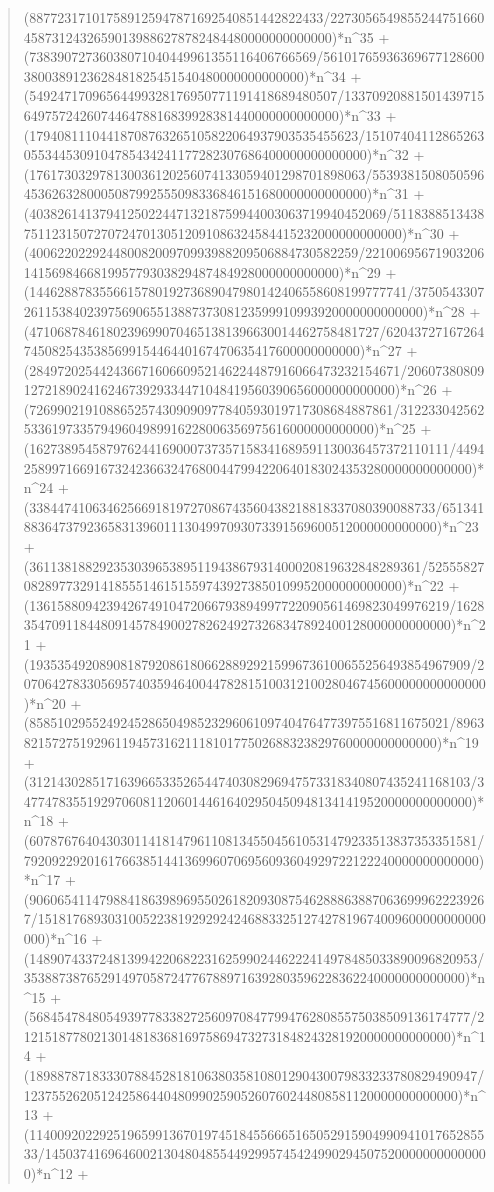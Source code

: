 \documentclass[11pt,a4paper]{article}
\theoremstyle{plain}
\theoremstyle{definition}
\begin{document}
\begin{quote}
(887723171017589125947871692540851442822433/227305654985524475166045873124326590139886278782484480000000000000)*n\^{}35 + (73839072736038071040449961355116406766569/561017659363696771286003800389123628481825451540480000000000000)*n\^{}34 + (54924717096564499328176950771191418689480507/13370920881501439715649757242607446478816839928381440000000000000)*n\^{}33 + (17940811104418708763265105822064937903535455623/151074041128652630553445309104785434241177282307686400000000000000)*n\^{}32 + (176173032978130036120256074133059401298701898063/55393815080505964536263280005087992555098336846151680000000000000)*n\^{}31 + (403826141379412502244713218759944003063719940452069/5118388513438751123150727072470130512091086324584415232000000000000)*n\^{}30 + (40062202292448008200970993988209506884730582259/22100695671903206141569846681995779303829487484928000000000000)*n\^{}29 + (144628878355661578019273689047980142406558608199777741/3750543307261153840239756906551388737308123599910993920000000000000)*n\^{}28 + (47106878461802396990704651381396630014462758481727/62043727167264745082543538569915446440167470635417600000000000)*n\^{}27 + (28497202544243667160660952146224487916066473232154671/2060738080912721890241624673929334471048419560390656000000000000)*n\^{}26 + (7269902191088652574309090977840593019717308684887861/31223304256253361973357949604989916228006356975616000000000000)*n\^{}25 + (162738954587976244169000737357158341689591130036457372110111/44942589971669167324236632476800447994220640183024353280000000000000)*n\^{}24 + (3384474106346256691819727086743560438218818337080390088733/65134188364737923658313960111304997093073391569600512000000000000)*n\^{}23 + (36113818829235303965389511943867931400020819632848289361/52555827082897732914185551461515597439273850109952000000000000)*n\^{}22 + (136158809423942674910472066793894997722090561469823049976219/16283547091184480914578490027826249273268347892400128000000000000)*n\^{}21 + (193535492089081879208618066288929215996736100655256493854967909/2070642783305695740359464004478281510031210028046745600000000000000)*n\^{}20 + (858510295524924528650498523296061097404764773975516811675021/896382157275192961194573162111810177502688323829760000000000000)*n\^{}19 + (312143028517163966533526544740308296947573318340807435241168103/34774783551929706081120601446164029504509481341419520000000000000)*n\^{}18 + (6078767640430301141814796110813455045610531479233513837353351581/79209229201617663851441369960706956093604929722122240000000000000)*n\^{}17 + (906065411479884186398969550261820930875462888638870636999622239267/1518176893031005223819292924246883325127427819674009600000000000000)*n\^{}16 + (1489074337248139942206822316259902446222414978485033890096820953/353887387652914970587247767889716392803596228362240000000000000)*n\^{}15 + (568454784805493977833827256097084779947628085575038509136174777/21215187780213014818368169758694732731848243281920000000000000)*n\^{}14 + (1898878718333078845281810638035810801290430079833233780829490947/12375526205124258644048099025905260760244808581120000000000000)*n\^{}13 + (1140092022925196599136701974518455666516505291590499094101765285533/1450374169646002130480485544929957454249902945075200000000000000)*n\^{}12 + 
\end{quote}
\end{document}
